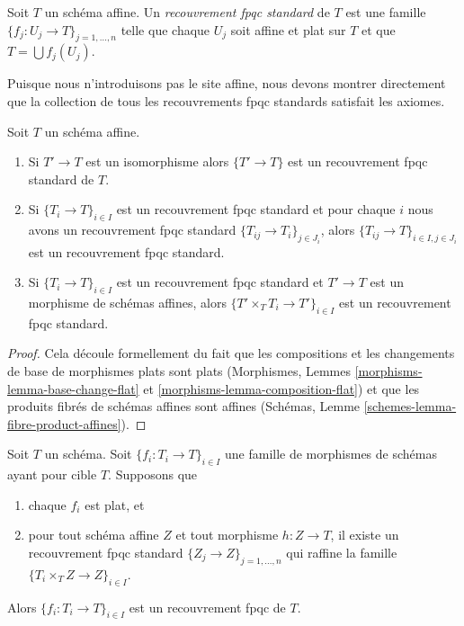 \begin{definition}
\label{definition-standard-fpqc}
Soit $T$ un schéma affine. Un {\it recouvrement fpqc standard} de $T$ est une famille $\{f_j : U_j \to T\}_{j = 1, \ldots, n}$ telle que chaque $U_j$ soit affine et plat sur $T$ et que $T = \bigcup f_j(U_j)$.
\end{definition}

\noindent
Puisque nous n'introduisons pas le site affine, nous devons montrer directement que la collection de tous les recouvrements fpqc standards satisfait les axiomes.

\begin{lemma}
\label{lemma-fpqc-affine-axioms}
Soit $T$ un schéma affine.
\begin{enumerate}
\item Si $T' \to T$ est un isomorphisme alors $\{T' \to T\}$ est un recouvrement fpqc standard de $T$.
\item Si $\{T_i \to T\}_{i\in I}$ est un recouvrement fpqc standard et pour chaque $i$ nous avons un recouvrement fpqc standard $\{T_{ij} \to T_i\}_{j\in J_i}$, alors $\{T_{ij} \to T\}_{i \in I, j\in J_i}$ est un recouvrement fpqc standard.
\item Si $\{T_i \to T\}_{i\in I}$ est un recouvrement fpqc standard et $T' \to T$ est un morphisme de schémas affines, alors $\{T' \times_T T_i \to T'\}_{i\in I}$ est un recouvrement fpqc standard.
\end{enumerate}
\end{lemma}

\begin{proof}
Cela découle formellement du fait que les compositions et les changements de base de morphismes plats sont plats (Morphismes, Lemmes \ref{morphisms-lemma-base-change-flat} et \ref{morphisms-lemma-composition-flat}) et que les produits fibrés de schémas affines sont affines (Schémas, Lemme \ref{schemes-lemma-fibre-product-affines}).
\end{proof}


\begin{lemma}
\label{lemma-fpqc-covering-affines-mapping-in}
Soit $T$ un schéma. Soit $\{f_i : T_i \to T\}_{i \in I}$ une famille de morphismes de schémas ayant pour cible $T$. Supposons que
\begin{enumerate}
\item chaque $f_i$ est plat, et
\item pour tout schéma affine $Z$ et tout morphisme $h : Z \to T$, il existe un recouvrement fpqc standard $\{Z_j \to Z\}_{j = 1, \ldots, n}$ qui raffine la famille $\{T_i \times_T Z \to Z\}_{i \in I}$.
\end{enumerate}
Alors $\{f_i : T_i \to T\}_{i \in I}$ est un recouvrement fpqc de $T$.
\end{lemma}

